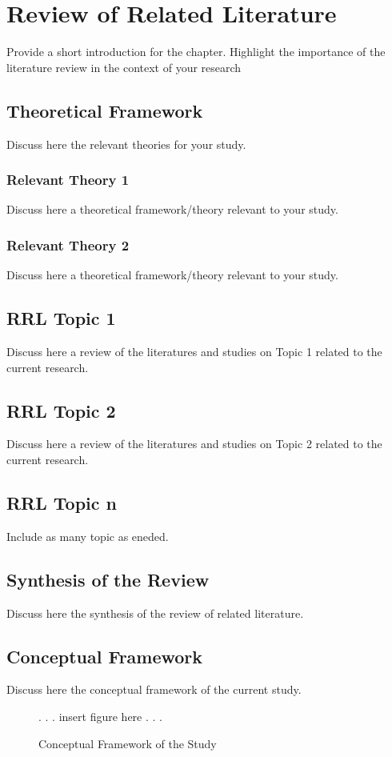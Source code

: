\chapter{Review of Related Literature}

Provide a short introduction for the chapter. Highlight the importance of the literature review in the context of your research

\section{Theoretical Framework}
Discuss here the relevant theories for your study.

\subsection{Relevant Theory 1}
Discuss here a theoretical framework/theory relevant to your study.

\subsection{Relevant Theory 2}
Discuss here a theoretical framework/theory relevant to your study.


\section{RRL Topic 1}
Discuss here a review of the literatures and studies on Topic 1 related to the current research. 

\section{RRL Topic 2}
Discuss here a review of the literatures and studies on Topic 2 related to the current research.

\section{RRL Topic n}
Include as many topic as eneded.

\section{Synthesis of the Review}
Discuss here the synthesis of the review of related literature.

\section{Conceptual Framework}
Discuss here the conceptual framework of the current study.

\begin{figure}[h]
	\centering
	\caption{Conceptual Framework of the Study}
	\label{fig:IPO}
	 . . . insert figure here . . . 	
\end{figure}


